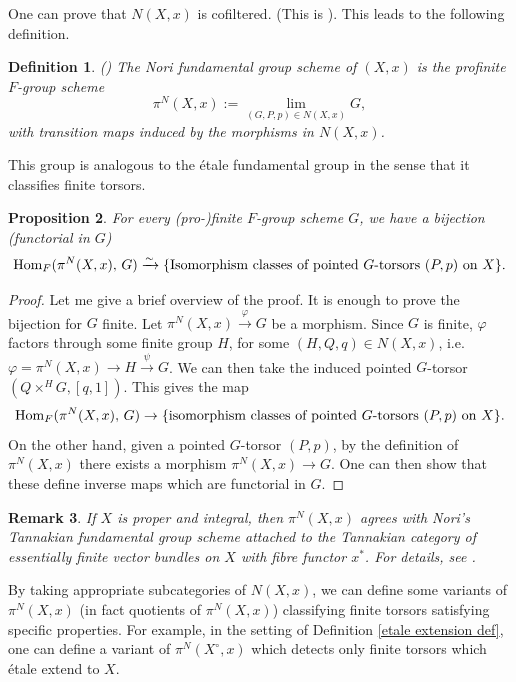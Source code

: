\documentclass[a4paper,english,12pt]{amsart}
\newtheorem{definition}{Definition}[section]
\newtheorem{proposition}[definition]{Proposition}
\newtheorem{remark}[definition]{Remark}
\numberwithin{equation}{section}
\newcommand{\Hom}{\textup{Hom}}
\renewcommand{\_}{\rule{0.25cm}{0.4pt}}
\begin{document}
One can prove that $N(X,x)$ is cofiltered. (This is \cite[Proposition 2, p.85]{Nori1982-tm}). This leads to the following definition.
 
\begin{definition}(\cite[Chapter II]{Nori1982-tm})
The Nori fundamental group scheme of $(X,x)$ is the profinite $F$-group scheme
\[
\pi^{N}(X,x):=\lim_{(G,P,p)\in N(X,x)} G,
\]
with transition maps induced by the morphisms in $N(X,x)$.
\end{definition}

This group is analogous to the étale fundamental group in the sense that it classifies finite torsors.

\begin{proposition}\label{universal property pi^N}
For every (pro-)finite $F$-group scheme $G$, we have a bijection (functorial in $G$)
\[
\Hom_{F}(\pi^{N}(X,x),\,G)\xrightarrow{\sim}\{\text{Isomorphism classes of pointed $G$-torsors $(P,p)$ on $X$}\}.
\]
\end{proposition}
\begin{proof}
    Let me give a brief overview of the proof. It is enough to prove the bijection for $G$ finite. Let $\pi^{N}(X,x)\xrightarrow{\varphi} G$ be a morphism. Since $G$ is finite, $\varphi$ factors through some finite group $H$, for some $(H,Q,q)\in N(X,x)$, i.e. $\varphi=\pi^{N}(X,x)\to H\xrightarrow{\psi} G$. We can then take the induced pointed $G$-torsor $(Q\times^{H}G,[q,1])$. This gives the map 
    \[
    \Hom_{F}(\pi^{N}(X,x),\,G)\to\{\text{isomorphism classes of pointed $G$-torsors $(P,p)$ on $X$}\}.
    \]
    On the other hand, given a pointed $G$-torsor $(P,p)$, by the definition of $\pi^{N}(X,x)$ there exists a morphism $\pi^{N}(X,x)\to G$. One can then show that these define inverse maps which are functorial in $G$.
\end{proof}

\begin{remark}
If $X$ is proper and integral, then $\pi^{N}(X,x)$ agrees with Nori's Tannakian fundamental group scheme attached to the Tannakian category of
essentially finite vector bundles on $X$ with fibre functor $x^{*}$. For details, see \cite{Nori1982-tm}.
\end{remark}

By taking appropriate subcategories of $N(X,x)$, we can define some variants of $\pi^{N}(X,x)$ (in fact quotients of $\pi^{N}(X,x)$) classifying finite torsors satisfying specific properties. For example, in the setting of Definition \ref{etale extension def}, one can define a variant of $\pi^{N}(X^{\circ},x)$ which detects only finite torsors which étale extend to $X$.
\end{document}
